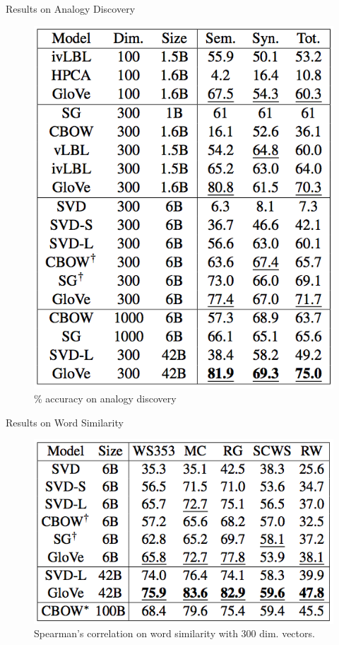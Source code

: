 \begin{frame}{Results on Analogy Discovery}
  \begin{figure}
    \includegraphics[scale=0.27]{images/results1.png}
    \caption{\% accuracy on analogy discovery}
  \end{figure}
\end{frame}

\begin{frame}{Results on Word Similarity}
  \begin{figure}
    \includegraphics[scale=0.4]{images/results2.png}
    \caption{Spearman's correlation on word similarity with 300 dim. vectors.}
  \end{figure}
\end{frame}

